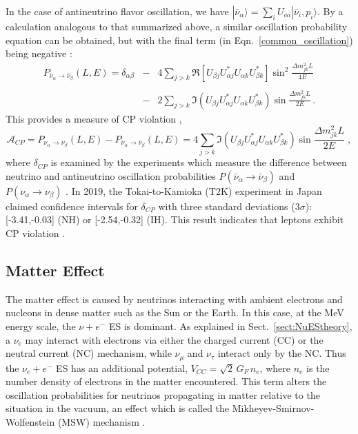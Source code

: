 In the case of antineutrino flavor oscillation, we have $|\bar{\nu}_\alpha\rangle=\sum_i U_{\alpha i}|\bar{\nu}_i,p_i\rangle$. By a calculation analogous to that summarized above, a similar oscillation probability equation can be obtained, but with the final term (in Eqn.~\ref{common_oscillation}) being negative \cite{aitchison2012gauge}:
\begin{eqnarray}\label{antiNu_eq1}
P_{\bar{\nu}_\alpha\to\bar{\nu}_\beta}(L,E)=\delta_{\alpha\beta} &-& 4\sum_{j>k} \Re[U_{\beta j}U^*_{\alpha j}U_{\alpha k}U^*_{\beta k}]\sin^2\frac{\Delta m^2_{jk}L}{4E} \nonumber\\
&\;& \\
&-& 2\sum_{j>k} \Im(U_{\beta j}U^*_{\alpha j}U_{\alpha k}U^*_{\beta k})\sin\frac{\Delta m^2_{jk}L}{2E} \nonumber \, .
\end{eqnarray}
This provides a measure of CP violation \cite{aitchison2012gauge},
\begin{equation}\label{cpV_eq1}
\mathcal{A}_{CP}=P_{\nu_\alpha\to\nu_\beta}(L,E)-P_{\bar{\nu}_\alpha\to\bar{\nu}_\beta}(L,E)=
4\sum_{j>k} \Im(U_{\beta j}U^*_{\alpha j}U_{\alpha k}U^*_{\beta k})\sin\frac{\Delta m^2_{jk}L}{2E} \;,
\end{equation}
where $\delta_{CP}$ is examined by the experiments which measure the difference between neutrino and antineutrino oscillation probabilities $P(\bar{\nu}_\alpha\to\bar{\nu}_\beta)$ and $P(\nu_\alpha\to\nu_\beta)$ \cite{xing2011neutrinos}. In 2019, the Tokai-to-Kamioka (T2K) experiment in Japan claimed confidence intervals for $\delta_{CP}$ with three standard deviations ($3\sigma$): [-3.41,-0.03] (NH) or [-2.54,-0.32] (IH). This result indicates that leptons exhibit CP violation \cite{abe2019constraint}.

\subsection{Matter Effect}\label{sect:MSW}

The matter effect is caused by neutrinos interacting with ambient electrons and nucleons in dense matter such as the Sun or the Earth. In this case, at the MeV energy scale, the $\nu+e^-$ ES is dominant. As explained in Sect.~\ref{sect:NuEStheory}, a $\nu_e$ may interact with electrons via either the charged current (CC) or the neutral current (NC) mechanism, while $\nu_\mu$ and $\nu_\tau$ interact only by the NC. Thus the $\nu_e+e^-$ ES has an additional potential, $V_{CC} =\sqrt{2} \, G_F \, n_e$, where $n_e$ is the number density of electrons in the matter encountered. This term alters the oscillation probabilities for neutrinos propagating in matter relative to the situation in the vacuum, an effect which is called the Mikheyev-Smirnov-Wolfenstein (MSW) mechanism \cite{smirnov2016solar,smirnov2005msw}.

